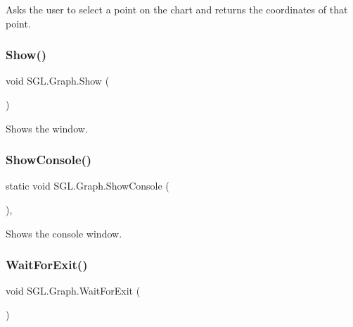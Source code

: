 Asks the user to select a point on the chart and returns the coordinates of that point. 

\mbox{\label{class_s_g_l_1_1_graph_ac67339a4d4304b41258344692535c139}} 
\subsubsection{\texorpdfstring{Show()}{Show()}}
{\footnotesize\ttfamily void S\+G\+L.\+Graph.\+Show (\begin{DoxyParamCaption}{ }\end{DoxyParamCaption})\hspace{0.3cm}{\ttfamily [inline]}}



Shows the window. 

\mbox{\label{class_s_g_l_1_1_graph_ab5ae05aa7165b934f951e0a2fb451c8d}} 
\subsubsection{\texorpdfstring{Show\+Console()}{ShowConsole()}}
{\footnotesize\ttfamily static void S\+G\+L.\+Graph.\+Show\+Console (\begin{DoxyParamCaption}{ }\end{DoxyParamCaption})\hspace{0.3cm}{\ttfamily [inline]}, {\ttfamily [static]}}



Shows the console window. 

\mbox{\label{class_s_g_l_1_1_graph_a6b99d7fed85538b0dd5906e359fcf9c0}} 
\subsubsection{\texorpdfstring{Wait\+For\+Exit()}{WaitForExit()}}
{\footnotesize\ttfamily void S\+G\+L.\+Graph.\+Wait\+For\+Exit (\begin{DoxyParamCaption}{ }\end{DoxyParamCaption})\hspace{0.3cm}{\ttfamily [inline]}}



